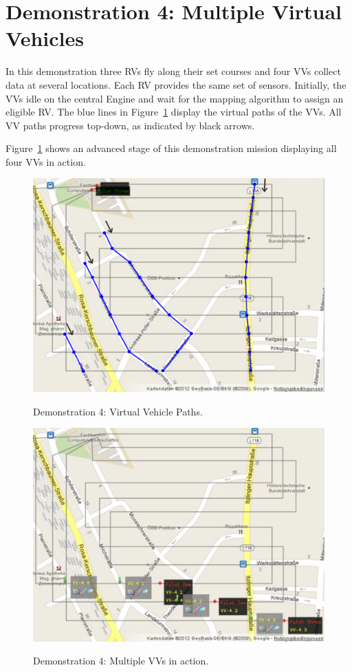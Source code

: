 \section{Demonstration 4: Multiple Virtual Vehicles}
In this demonstration three \acp{RV} fly along their set courses and four \acp{VV} collect data at several locations.
Each \ac{RV} provides the same set of sensors. Initially, the \acp{VV} idle on the central Engine and wait for
the mapping algorithm to assign an eligible \ac{RV}.  
%
The blue lines in Figure~\ref{fig:demo4img1} display the virtual paths of the \acp{VV}.
All \ac{VV} paths progress top-down, as indicated by black arrows.

Figure~\ref{fig:demo4img1} shows an advanced stage of this demonstration mission displaying all four \acp{VV} in action.
\begin{figure}[h]
	\begin{center}
		{\includegraphics[width=11.42cm]{ese-demo4-1.png}}
	\end{center}
		\caption{Demonstration 4: Virtual Vehicle Paths.\label{fig:demo4img1}}
\end{figure}


\begin{figure}[h]
	\begin{center}
		{\includegraphics[width=11.42cm]{ese-demo4-2.png}}
	\end{center}
		\caption{Demonstration 4: Multiple \acsp{VV} in action.\label{fig:demo4img2}}
\end{figure}

